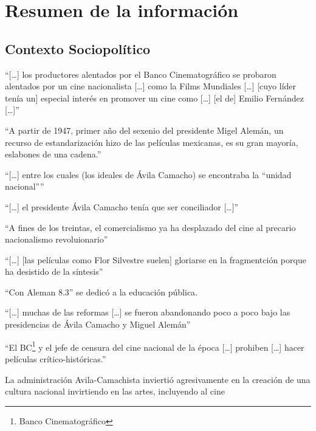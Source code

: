 \section{Resumen de la información}

\subsection{Contexto Sociopolítico}
\begin{compactitem}
\item ``[\ldots] los productores alentados por el Banco Cinematográfico se probaron alentados por un cine nacionalista [\ldots] como la Films Mundiales [\ldots] [cuyo líder tenía un]  especial interés en promover un cine como [\ldots] [el de] Emilio Fernández [\ldots]''\autocite[10]{garcia_riera_historia_1992}
\item ``A partir de 1947, primer año del sexenio del presidente Migel Alemán, un recurso de estandarización hizo de las películas mexicanas, es su gran mayoría, eslabones de una cadena.''\autocite[105]{garcia_riera_historia_1993}
\item ``[\ldots] entre los cuales (los ideales de Ávila Camacho) se encontraba la ``unidad nacional''''\autocite[366]{sanchez_vi._2010}
\item ``[\ldots] el presidente Ávila Camacho tenía que ser conciliador [\ldots]''\autocite[365]{sanchez_vi._2010}
\item ``A fines de los treintas, el comercialismo ya ha desplazado del cine al precario nacionalismo revoluionario''\autocite[439]{cosio_villegas_notas_1976}
\item ``[\ldots] [las películas como Flor Silvestre suelen] gloriarse en la fragmentción porque ha desistido de la síntesis''\autocite[440]{cosio_villegas_notas_1976}
\item ``Con Aleman 8.3'' se dedicó a la educación pública. \autocite[451]{pablos_escuela_1998-1}
\item ``[\ldots] muchas de las reformas [\ldots] se fueron abandonando poco a poco  bajo las presidencias de Ávila Camacho y Miguel Alemán''\autocite[62]{consuelo_rangel_ley_2006}
\item ``El BC\footnote{Banco Cinematográfico} y el jefe de censura del cine nacional de la época [\ldots] prohiben [\ldots] hacer películas crítico-históricas.''\autocite[179]{guerrero_imagen_2005}
\item La administración Avila-Camachista inviertió agresivamente en la creación de una cultura nacional invirtiendo en las artes, incluyendo al cine\autocite[35]{tierney_myths_2002}

\end{compactitem}
